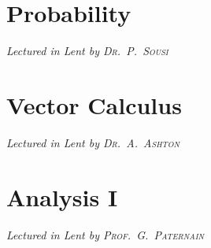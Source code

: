 \chapter[Probability \\ \textnormal{\emph{Lectured in Lent \oldstylenums{2021} by \textsc{Dr.\ P.\ Sousi}}}]{Probability}
\emph{\Large Lectured in Lent  by \textsc{Dr.\ P.\ Sousi}}


\chapter[Vector Calculus \\ \textnormal{\emph{Lectured in Lent \oldstylenums{2021} by \textsc{Dr.\ A.\ Ashton}}}]{Vector Calculus}
\emph{\Large Lectured in Lent  by \textsc{Dr.\ A.\ Ashton}}


\chapter[Analysis I \\ \textnormal{\emph{Lectured in Lent \oldstylenums{2021} by \textsc{Prof.\ G.\ Paternain}}}]{Analysis I}
\emph{\Large Lectured in Lent  by \textsc{Prof.\ G.\ Paternain}}



